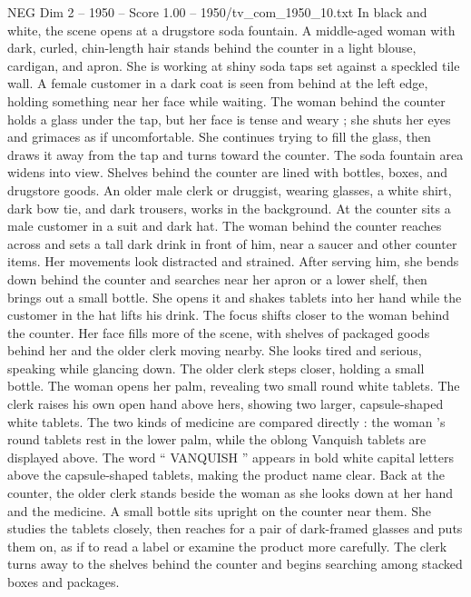 \begin{textsample}{NEG Dim 2 – 1950 – Score 1.00 – 1950/tv\_com\_1950\_10.txt}  \label{ex:f2_neg_018}
In black and white, the scene opens at a drugstore soda fountain.
A middle-aged woman with dark, curled, chin-length hair stands behind the counter in a light blouse, cardigan, and apron.
She is working at shiny soda taps set against a speckled tile wall.
A female customer in a dark coat is seen from behind at the left edge, holding something near her face while waiting.
The woman behind the counter holds a glass under the tap, but her face is tense and weary ; she shuts her eyes and grimaces as if uncomfortable.
She continues trying to fill the glass, then draws it away from the tap and turns toward the counter.
The soda fountain area widens into view.
Shelves behind the counter are lined with bottles, boxes, and drugstore goods.
An older male clerk or druggist, wearing glasses, a white shirt, dark bow tie, and dark trousers, works in the background.
At the counter sits a male customer in a suit and dark hat.
The woman behind the counter reaches across and sets a tall dark drink in front of him, near a saucer and other counter items.
Her movements look distracted and strained.
After serving him, she bends down behind the counter and searches near her apron or a lower shelf, then brings out a small bottle.
She opens it and shakes tablets into her hand while the customer in the hat lifts his drink.
The focus shifts closer to the woman behind the counter.
Her face fills more of the scene, with shelves of packaged goods behind her and the older clerk moving nearby.
She looks tired and serious, speaking while glancing down.
The older clerk steps closer, holding a small bottle.
The woman opens her palm, revealing two small round white tablets.
The clerk raises his own open hand above hers, showing two larger, capsule-shaped white tablets.
The two kinds of medicine are compared directly : the woman ’s round tablets rest in the lower palm, while the oblong Vanquish tablets are displayed above.
The word “ VANQUISH ” appears in bold white capital letters above the capsule-shaped tablets, making the product name clear.
Back at the counter, the older clerk stands beside the woman as she looks down at her hand and the medicine.
A small bottle sits upright on the counter near them.
She studies the tablets closely, then reaches for a pair of dark-framed glasses and puts them on, as if to read a label or examine the product more carefully.
The clerk turns away to the shelves behind the counter and begins searching among stacked boxes and packages.

\end{textsample}
